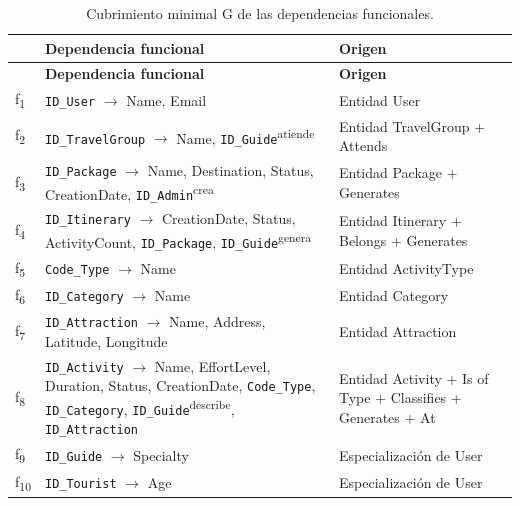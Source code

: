 \documentclass[11pt,a4paper]{article}
\begin{document}
{\footnotesize\setlength{\tabcolsep}{3pt}\renewcommand{\arraystretch}{1.15}
\begin{longtable}{|>{\raggedright\arraybackslash}p{0.78cm}|>{\raggedright\arraybackslash}p{9.68cm}|>{\raggedright\arraybackslash}p{4.88cm}|}
\caption{Cubrimiento minimal G de las dependencias funcionales.}\label{tab:cubrimiento}\\ \hline
\rowcolor{gray!20} \textbf{} & \textbf{Dependencia funcional} & \textbf{Origen} \\ \hline
\endfirsthead
\hline \rowcolor{gray!20} \textbf{} & \textbf{Dependencia funcional} & \textbf{Origen} \\ \hline
\endhead
f\textsubscript{1} & \texttt{ID\_User} \ensuremath{\rightarrow} Name, Email & Entidad User \\ \hline
f\textsubscript{2} & \texttt{ID\_TravelGroup} \ensuremath{\rightarrow} Name, \texttt{ID\_Guide}\textsuperscript{atiende} & Entidad TravelGroup + Attends \\ \hline
f\textsubscript{3} & \texttt{ID\_Package} \ensuremath{\rightarrow} Name, Destination, Status, CreationDate, \texttt{ID\_Admin}\textsuperscript{crea} & Entidad Package + Generates \\ \hline
f\textsubscript{4} & \texttt{ID\_Itinerary} \ensuremath{\rightarrow} CreationDate, Status, ActivityCount, \texttt{ID\_Package}, \texttt{ID\_Guide}\textsuperscript{genera} & Entidad Itinerary + Belongs + Generates \\ \hline
f\textsubscript{5} & \texttt{Code\_Type} \ensuremath{\rightarrow} Name & Entidad ActivityType \\ \hline
f\textsubscript{6} & \texttt{ID\_Category} \ensuremath{\rightarrow} Name & Entidad Category \\ \hline
f\textsubscript{7} & \texttt{ID\_Attraction} \ensuremath{\rightarrow} Name, Address, Latitude, Longitude & Entidad Attraction \\ \hline
f\textsubscript{8} & \texttt{ID\_Activity} \ensuremath{\rightarrow} Name, EffortLevel, Duration, Status, CreationDate, \texttt{Code\_Type}, \texttt{ID\_Category}, \texttt{ID\_Guide}\textsuperscript{describe}, \texttt{ID\_Attraction} & Entidad Activity + Is of Type + Classifies + Generates + At \\ \hline
f\textsubscript{9} & \texttt{ID\_Guide} \ensuremath{\rightarrow} Specialty & Especialización de User \\ \hline
f\textsubscript{10} & \texttt{ID\_Tourist} \ensuremath{\rightarrow} Age & Especialización de User \\ \hline

\end{longtable}}
\end{document}
